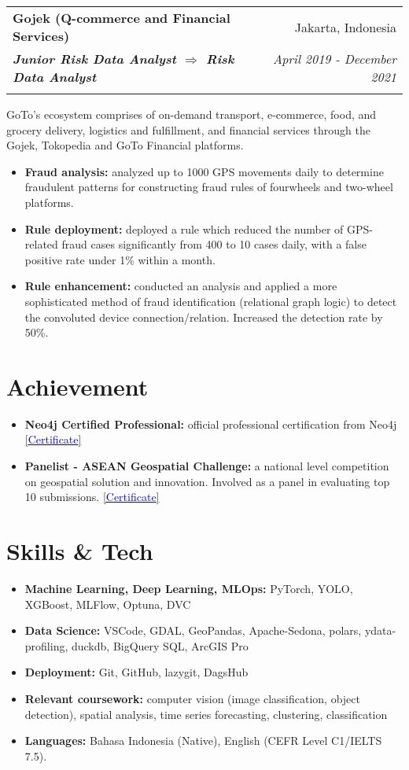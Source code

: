 \documentclass[a4paper, 11pt]{article}
\makeatletter
\newcommand{\resumeItem}[2]{
    \item\small{
        \textbf{#1}{#2 \vspace{-2pt}}
    }
}
\newcommand{\resumeSubheading}[4]{
    \vspace{-1pt}
    \begin{tabular*}{\textwidth}{l@{\extracolsep{\fill}}r}
        \color{lightblue}\textbf{#1} & #2 \\
        \textbf{\textit{\small#3}} & \textit{\small #4} \\
        \textnormal{}\vspace{-5pt}
    \end{tabular*}\vspace{-5pt}
}
\newcommand{\resumeItemListStart}{\begin{itemize}[leftmargin=*]\setlength\itemsep{0em}\vspace{-1pt}}
\newcommand{\resumeItemListEnd}{\end{itemize}\vspace{-5pt}}
\makeatother
\begin{document}
    \vspace{5pt}
    \resumeSubheading
    {Gojek (Q-commerce and Financial Services)}
    {Jakarta, Indonesia}
    {Junior Risk Data Analyst $\Rightarrow$ Risk Data Analyst}
    {April 2019 - December 2021}
    \small{GoTo’s ecosystem comprises of on-demand transport, e-commerce, food, and grocery delivery, logistics and fulfillment, and financial services through the Gojek, Tokopedia and GoTo Financial platforms.}
    \vspace{-1pt}
    \resumeItemListStart
    \resumeItem{Fraud analysis:}{ analyzed up to 1000 GPS movements daily to determine fraudulent patterns for constructing fraud rules of fourwheels and two-wheel platforms.}
    \resumeItem{Rule deployment:}{ deployed a rule which reduced the number of GPS-related fraud cases significantly from 400 to 10 cases daily, with a false positive rate under 1\% within a month.}
    \resumeItem{Rule enhancement:}{ conducted an analysis and applied a more sophisticated method of fraud identification (relational graph logic) to detect the convoluted device connection/relation. Increased the detection rate by 50\%.}
    \resumeItemListEnd
    
    \vspace{-10pt}
    \section{Achievement}

    \resumeItemListStart
    \resumeItem{Neo4j Certified Professional:}{ official professional certification from 
    Neo4j
    \href{https://graphacademy.neo4j.com/c/4cb304b6-5a5b-4f45-96cf-1840a2982e55/}{[\textcolor{blue}{Certificate}]}}
    \resumeItem{Panelist - ASEAN Geospatial Challenge:}{ a national level competition on 
    geospatial solution and innovation. Involved as a panel in evaluating top 10 submissions.
    \href{https://drive.google.com/file/d/1NkMhFTBGqnOs2HpcvlLVMFIajq2MSO9k/view?usp=sharing}{[\textcolor{blue}{Certificate}]}}
    \resumeItemListEnd

    \vspace{-10pt}
    \section{Skills \& Tech}
    \resumeItemListStart
    \resumeItem{Machine Learning, Deep Learning, MLOps:}{
        PyTorch, YOLO, XGBoost, MLFlow, Optuna, DVC
    }
    \resumeItem{Data Science:}{
        VSCode, GDAL, GeoPandas, Apache-Sedona, polars, ydata-profiling, duckdb, BigQuery SQL, ArcGIS Pro
    }
    \resumeItem{Deployment:}{
        Git, GitHub, lazygit, DagsHub
    }
    \resumeItem{Relevant coursework:}{
        computer vision (image classification, object detection),
        spatial analysis,
        time series forecasting,
        clustering,
        classification
    }
    \resumeItem{Languages:}{
        Bahasa Indonesia (Native), 
        English (CEFR Level C1/IELTS 7.5).
    }
    \resumeItemListEnd
\end{document}
